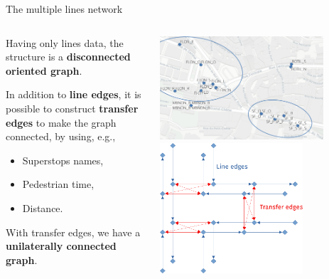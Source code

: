 \documentclass[10pt]{beamer}
\newcommand{\imp}[1]{\textbf{\color{cyan}#1}}
\begin{document}
	\begin{frame}{The multiple lines network}
		\begin{columns}
			\begin{column}{0.5\textwidth}
				Having only lines data, the structure is a \imp{disconnected oriented graph}. \linebreak
				
				In addition to \imp{line edges}, it is possible to construct \imp{transfer edges} to make the graph connected, by using, e.g.,
				\begin{itemize}
					\item Superstops names,
					\item Pedestrian time,
					\item Distance.
				\end{itemize} 
				\vspace{0.4cm}
				With transfer edges, we have a \imp{unilaterally connected graph}.
			\end{column}
			\begin{column}{0.5\textwidth} 
				\begin{center}
					\includegraphics[width=0.8\textwidth]{img/stop_area_c.png} \\
					\vspace{0.5cm}
					\includegraphics[width=0.7\textwidth]{img/edge_type2.png}
				\end{center}
			\end{column}
		\end{columns}
	\end{frame}
	
\end{document}
